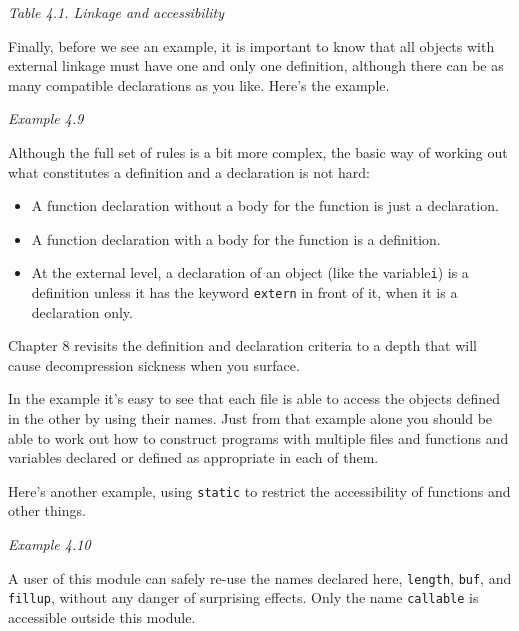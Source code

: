 \begin{center}\textit{Table 4.1. Linkage and accessibility}\end{center}


  Finally, before we see an example, it is important to know that all
   objects with external linkage must have one and only one definition,
   although there can be as many compatible declarations as you like. Here's
   the example.

\begin{center}\textit{Example 4.9}\end{center}

  Although the full set of rules is a bit more complex, the basic way of
   working out what constitutes a definition and a declaration is not
   hard:

  \begin{itemize}
   \item A function declaration without a body for the function is just a
    declaration.
   \item A function declaration with a body for the function is a
    definition.
   \item At the external level, a declaration of an object (like the
    variable\texttt{i}) is a definition unless it has the keyword
    \texttt{extern} in front of it, when it is a declaration only.
  \end{itemize}
  Chapter 8 revisits the definition and declaration criteria
   to a depth that will cause decompression sickness when you surface.


  In the example it's easy to see that each file is able to access the
   objects defined in the other by using their names. Just from that example
   alone you should be able to work out how to construct programs with
   multiple files and functions and variables declared or defined as
   appropriate in each of them.


  Here's another example, using \texttt{static} to restrict the
   accessibility of functions and other things.

\begin{center}\textit{Example 4.10}\end{center}

  A user of this module can safely re-use the names declared here,
   \texttt{length}, \texttt{buf}, and \texttt{fillup}, without
   any danger of surprising effects. Only the name \texttt{callable} is
   accessible outside this module.


